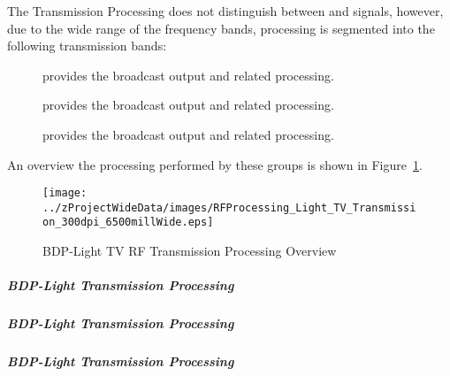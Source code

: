 The \RF Transmission Processing does not distinguish between \ATV and \DTV \RF signals, however, due to the wide range of the frequency bands, processing is segmented into the following transmission bands:
\begin{description}
	\item[\TVVHFLow] provides the \TVVHFLow broadcast output and related \RF processing.%
	\item[\TVVHFHigh] provides the \TVVHFHigh broadcast output and related \RF processing.%
	\item[\TVUHF] provides the \TVUHF broadcast output and related \RF processing.
\end{description}

An overview the processing performed by these groups is shown in Figure~\ref{fig:Light_RF_Processing_TV_Transmission}.
\begin{figure}[htbp]
	\centering
		\texttt{[image: ../zProjectWideData/images/RFProcessing\_Light\_TV\_Transmission\_300dpi\_6500millWide.eps]}
	\caption[BDP-Light TV RF Transmission Processing Overview]{BDP-Light TV RF Transmission Processing Overview}
	\label{fig:Light_RF_Processing_TV_Transmission}
\end{figure}

\subparagraph{BDP-Light \TVVHFLow \RF Transmission Processing}
\label{loc:BDP-Light_RF_TVVHFLo_Transmission}
\renewcommand{\ThisSubSegment}{BDP-Light \TVVHFLow RF\xspace}%


\subparagraph{BDP-Light \TVVHFHigh \RF Transmission Processing}
\label{loc:BDP-Light_RF_TVVHFHi_Transmission}
\renewcommand{\ThisSubSegment}{BDP-Light \TVVHFHigh RF\xspace}%


\subparagraph{BDP-Light \TVUHF \RF Transmission Processing}
\label{loc:BDP-Light_RF_TVUHF_Transmission}
\renewcommand{\ThisSubSegment}{BDP-Light \TVUHF RF\xspace}%

